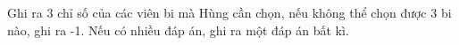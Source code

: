 Ghi ra 3 chỉ số của các viên bi mà Hùng cần chọn, nếu không thể chọn được 3 bi nào, ghi ra -1. Nếu có nhiều đáp án, ghi ra một đáp án bất kì.